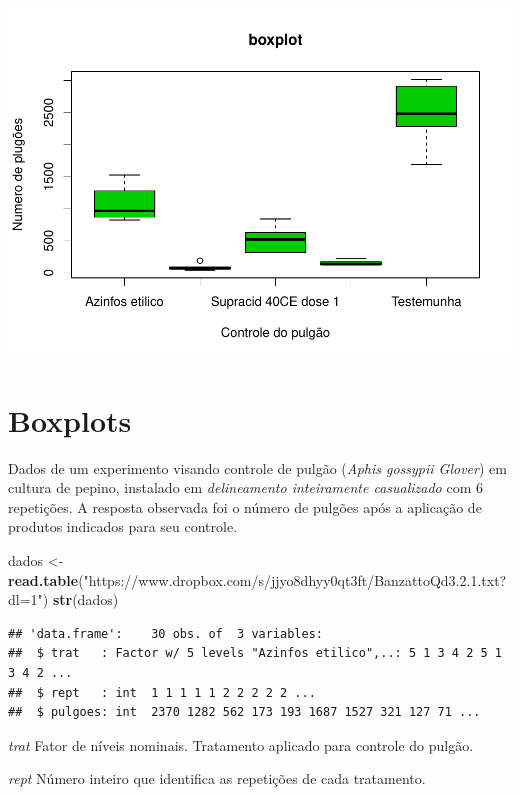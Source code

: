 \documentclass[
]{book}
\newenvironment{Shaded}{\begin{snugshade}}{\end{snugshade}}
\newcommand{\KeywordTok}[1]{\textcolor[rgb]{0.13,0.29,0.53}{\textbf{#1}}}
\newcommand{\NormalTok}[1]{#1}
\newcommand{\StringTok}[1]{\textcolor[rgb]{0.31,0.60,0.02}{#1}}
\begin{document}
\includegraphics{TudodoR_files/figure-latex/unnamed-chunk-171-1.pdf}

\hypertarget{boxplots}{%
\section{Boxplots}\label{boxplots}}

Dados de um experimento visando controle de pulgão (\emph{Aphis gossypii Glover}) em cultura de pepino, instalado em \emph{delineamento inteiramente casualizado} com 6 repetições. A resposta observada foi o número de pulgões após a aplicação de produtos indicados para seu controle.

\begin{Shaded}
\begin{Highlighting}[]
\NormalTok{dados <-}\StringTok{ }\KeywordTok{read.table}\NormalTok{(}\StringTok{"https://www.dropbox.com/s/jjyo8dhyy0qt3ft/BanzattoQd3.2.1.txt?dl=1"}\NormalTok{)}
\KeywordTok{str}\NormalTok{(dados)}
\end{Highlighting}
\end{Shaded}

\begin{verbatim}
## 'data.frame':    30 obs. of  3 variables:
##  $ trat   : Factor w/ 5 levels "Azinfos etilico",..: 5 1 3 4 2 5 1 3 4 2 ...
##  $ rept   : int  1 1 1 1 1 2 2 2 2 2 ...
##  $ pulgoes: int  2370 1282 562 173 193 1687 1527 321 127 71 ...
\end{verbatim}

\emph{trat}
Fator de níveis nominais. Tratamento aplicado para controle do pulgão.

\emph{rept}
Número inteiro que identifica as repetições de cada tratamento.
\end{document}

